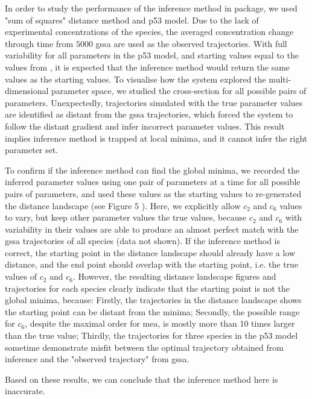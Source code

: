 In order to study the performance of the inference method in \means package, we used "sum of squares" distance method and p53 model. 
Due to the lack of experimental concentrations of the species, the averaged concentration change through time from $5000$ \gls{gssa} are used as the observed trajectories. 
With full variability for all parameters in the p53 model, and starting values equal to the values from \cite{gillespie_general_1976}, it is expected that the inference method would return the same values as the starting values. 
To visualise how the system explored the multi-dimensional parameter space, we studied the cross-section for all possible pairs of parameters. 
Unexpectedly, trajectories simulated with the true parameter values are identified as distant from the \gls{gssa} trajectories, which forced the system to follow the distant gradient and infer incorrect parameter values. This result implies inference method is trapped at local minima, and it cannot infer the right parameter set. 

To confirm if the inference method can find the global minima, we recorded the inferred parameter values using one pair of parameters at a time for all possible pairs of parameters, and used these values as the starting values to re-generated the distance landscape (see Figure 5 ). 
Here, we explicitly allow $c_2$ and $c_6$ values to vary, but keep other parameter values the true values, because $c_2$ and $c_6$ with variability in their values are able to produce an almost perfect match with the \gls{gssa} trajectories of all species (data not shown). 
If the inference method is correct, the starting point in the distance landscape should already have a low distance, and the end point should overlap with the starting point, i.e. the true values of $c_2$ and $c_6$.
However, the resulting distance landscape figures and trajectories for each species clearly indicate that the starting point is not the global minima, because: Firstly, the trajectories in the distance landscape shows the starting point can be distant from the minima; Secondly, the possible range for $c_6$, despite the maximal order for \gls{mea}, is mostly more than 10 times larger than the true value; Thirdly, the trajectories for three species in the p53 model sometime demonstrate misfit between the optimal trajectory obtained from inference and the "observed trajectory" from \gls{gssa}. 

Based on these results, we can conclude that the inference method here is inaccurate.

